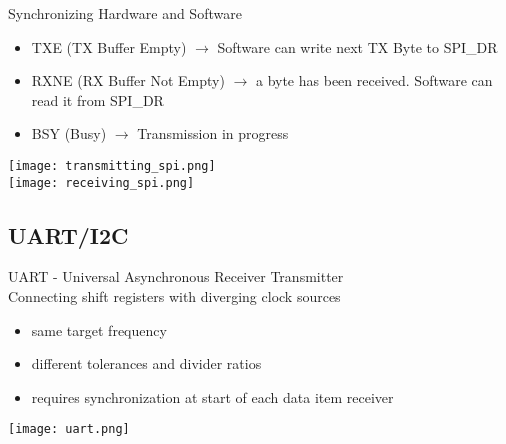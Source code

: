 \begin{concept}{Synchronizing Hardware and Software}
    \begin{itemize}
        \item TXE (TX Buffer Empty) $\rightarrow$ Software can write next TX Byte to SPI\_DR
        \item RXNE (RX Buffer Not Empty) $\rightarrow$ a byte has been received. Software can read it from SPI\_DR
        \item BSY (Busy) $\rightarrow$ Transmission in progress
    \end{itemize}
    \texttt{[image: transmitting\_spi.png]}\\
    \texttt{[image: receiving\_spi.png]}
\end{concept}

\subsection{UART/I2C}

\begin{definition}{UART - Universal Asynchronous Receiver Transmitter}\\
    Connecting shift registers with diverging clock sources
    \begin{itemize}
        \item same target frequency
        \item different tolerances and divider ratios
        \item requires synchronization at start of each data item receiver
    \end{itemize}
    \texttt{[image: uart.png]}
\end{definition}

